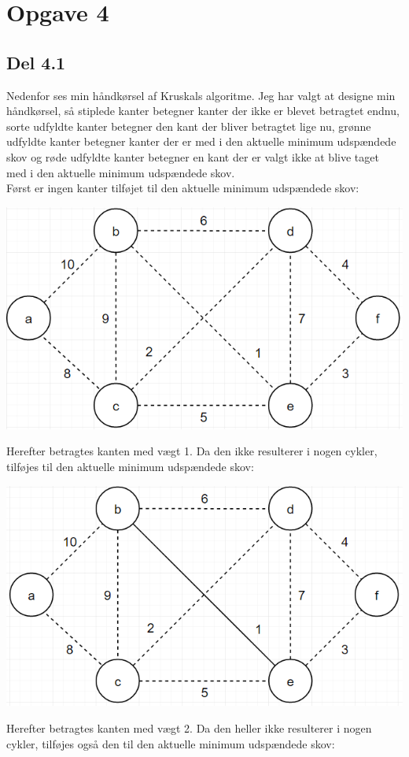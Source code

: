 \documentclass{report}
\begin{document}
\newpage


\section*{Opgave 4}
\subsection*{Del 4.1}
Nedenfor ses min håndkørsel af Kruskals algoritme. Jeg har valgt at designe min håndkørsel, så stiplede kanter betegner kanter der ikke er blevet betragtet endnu, sorte udfyldte kanter betegner den kant der bliver betragtet lige nu, grønne udfyldte kanter betegner kanter der er med i den aktuelle minimum udspændede skov og røde udfyldte kanter betegner en kant der er valgt ikke at blive taget med i den aktuelle minimum udspændede skov. \\
Først er ingen kanter tilføjet til den aktuelle minimum udspændede skov:
\begin{center}
    \includegraphics[height = 5 cm]{../entities/kruskal0}
\end{center}
Herefter betragtes kanten med vægt 1. Da den ikke resulterer i nogen cykler, tilføjes til den aktuelle minimum udspændede skov:
\begin{center}
    \includegraphics[height = 5 cm]{../entities/kruskal1}
\end{center}
Herefter betragtes kanten med vægt 2. Da den heller ikke resulterer i nogen cykler, tilføjes også den til den aktuelle minimum udspændede skov:
\end{document}

